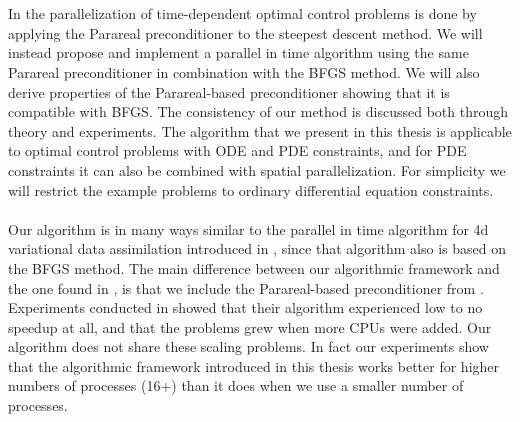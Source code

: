 \\
\\
In \cite{maday2002parareal} the parallelization of time-dependent optimal control problems is done by applying the Parareal preconditioner to the steepest descent method. We will instead propose and implement a parallel in time algorithm using the same Parareal preconditioner in combination with the BFGS method. We will also derive properties of the  Parareal-based preconditioner showing that it is compatible with BFGS. The consistency of our method is discussed both through theory and experiments. The algorithm that we present in this thesis is applicable to optimal control problems with ODE and PDE constraints, and for PDE constraints it can also be combined with spatial parallelization. For simplicity we will restrict the example problems to ordinary differential equation constraints.
\\
\\
Our algorithm is in many ways similar to the parallel in time algorithm for 4d variational data assimilation introduced in \cite{rao2016time}, since that algorithm also is based on the BFGS method. The main difference between our algorithmic framework and the one found in \cite{rao2016time}, is that we include the Parareal-based preconditioner from \cite{maday2002parareal}. Experiments conducted in \cite{rao2016time} showed that their algorithm experienced low to no speedup at all, and that the problems grew when more CPUs were added. Our algorithm does not share these scaling problems. In fact our experiments show that the algorithmic framework introduced in this thesis works better for higher numbers of processes (16+) than it does when we use a smaller number of processes.
